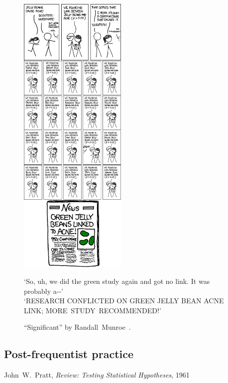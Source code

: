 \begin{figure}[tp]
\centering
\includegraphics[width=0.46\textwidth]{figures/searches_significant_shrink.png}
\\
\begin{footnotesize}
`So, uh, we did the green study again and got no link. It was probably a{-}{-}'
\\
`RESEARCH CONFLICTED ON GREEN JELLY BEAN ACNE LINK; MORE~STUDY~RECOMMENDED!'
\end{footnotesize}
\caption[
``Significant'' by Randall~Munroe
]{%
``Significant'' by Randall~Munroe~\cite{xkcd2011significant}.
}
\label{fig:searches_significant}
\end{figure}


\begin{singlespacing}
\section{Post-frequentist practice}
\label{sec:searches_practice}
\begin{epigraphs}
%
{John~W.~Pratt,
\textit{Review: Testing Statistical Hypotheses},
1961~\cite{pratt1961testing}}
\end{epigraphs}
\end{singlespacing}


